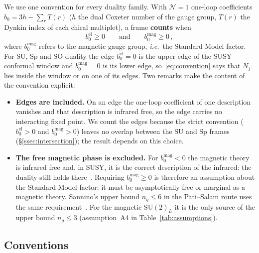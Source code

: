 \documentclass[11pt,a4paper]{article}
\theoremstyle{plain}
\theoremstyle{definition}
\theoremstyle{remark}
\newcommand{\Nf}{N_{\!f}}
\newcommand{\ngen}{n_g}
\newcommand{\SU}[1]{\mathrm{SU}(#1)}
\newcommand{\ie}{\textit{i.e.}}
\begin{document}
We use one convention for every duality family.  With $\mathcal{N}=1$
one-loop coefficients $b_0 = 3h - \sum_r T(r)$ ($h$ the dual Coxeter
number of the gauge group, $T(r)$ the Dynkin index of each chiral
multiplet), a frame \textbf{counts} when
\begin{equation}\label{eq:convention}
  b_0^{\mathrm{el}} \geq 0
  \qquad\text{and}\qquad
  b_0^{\mathrm{mag}} \geq 0\,,
\end{equation}
where $b_0^{\mathrm{mag}}$ refers to the magnetic gauge group, \ie\ the
Standard Model factor.  For $\mathrm{SU}$, $\mathrm{Sp}$ and $\mathrm{SO}$ duality the edge
$b_0^{\mathrm{el}} = 0$ is the upper edge of the SUSY conformal window and
$b_0^{\mathrm{mag}} = 0$ is its lower edge, so~\eqref{eq:convention} says
that $\Nf$ lies inside the window or on one of its edges.  Two remarks
make the content of the convention explicit:
\begin{itemize}
  \item \textbf{Edges are included.}  On an edge the one-loop coefficient
    of one description vanishes and that description is infrared free,
    so the edge carries no interacting fixed point.  We count the edges
    because the strict convention ($b_0^{\mathrm{el}} > 0$ and
    $b_0^{\mathrm{mag}} > 0$) leaves no overlap between the SU and Sp
    frames (\S\ref{ssec:intersection}); the result depends on this
    choice.
  \item \textbf{The free magnetic phase is excluded.}  For
    $b_0^{\mathrm{mag}} < 0$ the magnetic theory is infrared free and,
    in SUSY, it is the correct description of the infrared: the duality
    still holds there~\cite{IS1995}.  Requiring
    $b_0^{\mathrm{mag}} \geq 0$ is therefore an assumption about the
    Standard Model factor: it must be asymptotically free or marginal as
    a magnetic theory.  Sannino's upper bound $\ngen \leq 6$ in the
    Pati--Salam route uses the same requirement~\cite{Sannino2011}.  For
    the magnetic $\SU{2}_L$ it is the only source of the upper bound
    $\ngen \leq 3$ (assumption~A4 in Table~\ref{tab:assumptions}).
\end{itemize}

\subsection{Conventions}
\end{document}
